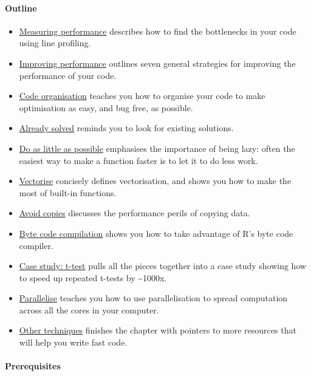 \hypertarget{outline}{%
\paragraph{Outline}\label{outline}}

\begin{itemize}
\item
  \protect\hyperlink{measure-perf}{Measuring performance} describes how
  to find the bottlenecks in your code using line profiling.
\item
  \protect\hyperlink{improve-perf}{Improving performance} outlines seven
  general strategies for improving the performance of your code.
\item
  \protect\hyperlink{code-organisation}{Code organisation} teaches you
  how to organise your code to make optimisation as easy, and bug free,
  as possible.
\item
  \protect\hyperlink{already-solved}{Already solved} reminds you to look
  for existing solutions.
\item
  \protect\hyperlink{be-lazy}{Do as little as possible} emphasises the
  importance of being lazy: often the easiest way to make a function
  faster is to let it to do less work.
\item
  \protect\hyperlink{vectorise}{Vectorise} concisely defines
  vectorisation, and shows you how to make the most of built-in
  functions.
\item
  \protect\hyperlink{avoid-copies}{Avoid copies} discusses the
  performance perils of copying data.
\item
  \protect\hyperlink{byte-code}{Byte code compilation} shows you how to
  take advantage of R's byte code compiler.
\item
  \protect\hyperlink{t-test}{Case study: t-test} pulls all the pieces
  together into a case study showing how to speed up repeated t-tests by
  \textasciitilde{}1000x.
\item
  \protect\hyperlink{parallelise}{Parallelise} teaches you how to use
  parallelisation to spread computation across all the cores in your
  computer.
\item
  \protect\hyperlink{more-techniques}{Other techniques} finishes the
  chapter with pointers to more resources that will help you write fast
  code.
\end{itemize}

\hypertarget{prerequisites}{%
\paragraph{Prerequisites}\label{prerequisites}}

